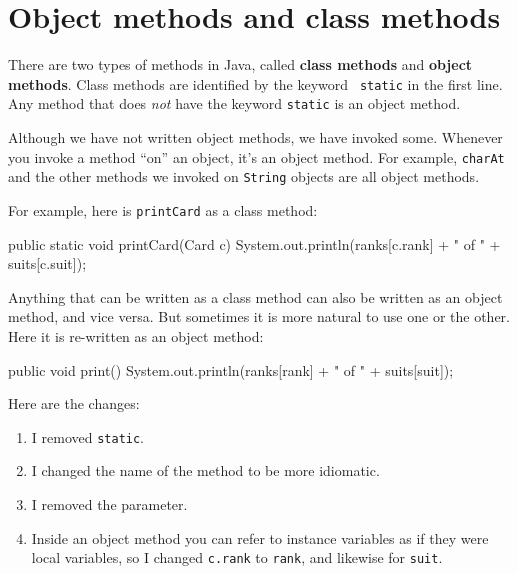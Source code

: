 \section{Object methods and class methods}


There are two types of methods in Java, called {\bf class methods} and
{\bf object methods}.  Class methods are identified by the keyword {\tt
  static} in the first line.  Any method that does {\em not} have the
keyword {\tt static} is an object method.

Although we have not written object methods, we have invoked some.
Whenever you invoke a method ``on'' an object, it's an object method.
For example, {\tt charAt} and the other methods we invoked on {\tt String}
objects are all object methods.

For example, here is {\tt printCard} as a class method:

\begin{code}
    public static void printCard(Card c) {
        System.out.println(ranks[c.rank] + " of " + suits[c.suit]);
    }
\end{code}

Anything that can be written as a class method can also be written as an
object method, and vice versa.  But sometimes it is more natural to
use one or the other.
Here it is re-written as an object method:

\begin{code}
    public void print() {
        System.out.println(ranks[rank] + " of " + suits[suit]);
    }
\end{code}

Here are the changes:

\begin{enumerate}

\item I removed {\tt static}.

\item I changed the name of the method to be more idiomatic.

\item I removed the parameter.

\item Inside an object method you can refer to instance variables
as if they were local variables, so I changed {\tt c.rank} to {\tt rank},
and likewise for {\tt suit}.

\end{enumerate}

